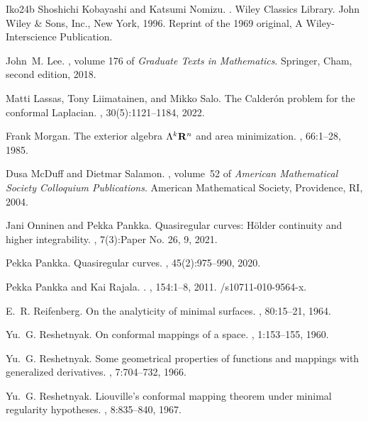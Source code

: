 \documentclass[a4paper,leqno,11pt]{amsart}
\numberwithin{equation}{section}
\theoremstyle{remark}
\theoremstyle{remark}
\begin{document}
\begin{thebibliography}{{Iko}24b}
Shoshichi Kobayashi and Katsumi Nomizu.
.
\newblock Wiley Classics Library. John Wiley \& Sons, Inc., New York, 1996.
\newblock Reprint of the 1969 original, A Wiley-Interscience Publication.

John~M. Lee.
, volume 176 of {\em Graduate Texts in Mathematics}.
\newblock Springer, Cham, second edition, 2018.

Matti Lassas, Tony Liimatainen, and Mikko Salo.
\newblock The {C}alder\'on problem for the conformal {L}aplacian.
, 30(5):1121--1184, 2022.

Frank Morgan.
\newblock The exterior algebra {$\Lambda^k{\bf R}^n$} and area minimization.
, 66:1--28, 1985.

Dusa McDuff and Dietmar Salamon.
, volume~52 of {\em American Mathematical Society Colloquium Publications}.
\newblock American Mathematical Society, Providence, RI, 2004.

Jani Onninen and Pekka Pankka.
\newblock Quasiregular curves: {H}\"{o}lder continuity and higher integrability.
, 7(3):Paper No. 26, 9, 2021.

Pekka Pankka.
\newblock Quasiregular curves.
, 45(2):975--990, 2020.

Pekka Pankka and Kai Rajala.
.
, 154:1--8, 2011.
/s10711-010-9564-x.

E.~R. Reifenberg.
\newblock On the analyticity of minimal surfaces.
, 80:15--21, 1964.

Yu.~G. Reshetnyak.
\newblock On conformal mappings of a space.
, 1:153--155, 1960.

Yu.~G. Reshetnyak.
\newblock Some geometrical properties of functions and mappings with generalized derivatives.
, 7:704--732, 1966.

Yu.~G. Reshetnyak.
\newblock Liouville's conformal mapping theorem under minimal regularity hypotheses.
, 8:835--840, 1967.


\end{thebibliography}
\end{document}
